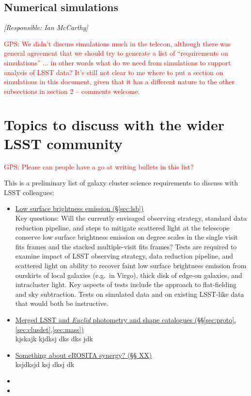 \documentclass[a4paper,11pt]{article}
\newcommand{\red}{\textcolor{red}}
\begin{document}
\subsection{Numerical simulations}\label{sec:sims}

{\it [Responsible: Ian McCarthy]}

\noindent\red{GPS: We didn't discuss simulations much in the telecon,
  although there was general agreement that we should try to generate
  a list of ``requirements on simulations'' ... in other words what do
  we need from simulations to support analysis of LSST data?  It's
  still not clear to me where to put a section on simulations in this
  document, given that it has a different nature to the other
  subsections in section 2 -- comments welcome.}

\section{Topics to discuss with the wider LSST community}

\red{GPS: Please can people have a go at writing bullets in this
  list?}

\noindent This is a preliminary list of galaxy cluster science
requirements to discuss with LSST colleagues:
\begin{itemize}
\item\underline{Low surface brightness emission
  (\S\ref{sec:lsb})}\smallskip\\Key questions: Will the currently
  envisaged observing strategy, standard data reduction pipeline, and
  steps to mitigate scattered light at the telescope conserve low
  surface brightness emission on degree scales in the single visit
  fits frames and the stacked multiple-visit fits frames?  Tests are
  required to examine impact of LSST observing strategy, data
  reduction pipeline, and scattered light on ability to recover faint
  low surface brightness emission from ourskirts of local galaxies
  (e.g.\ in Virgo), thick disk of edge-on galaxies, and intracluster
  light.  Key aspects of tests include the approach to flat-fielding
  and sky subtraction.  Tests on simulated data and on existing
  LSST-like data that would both be instructive.  
\item\underline{Merged LSST and \emph{Euclid} photometry and shape
  catalogues
  (\S\S\ref{sec:proto},\ref{sec:clusdet},\ref{sec:mass})}\smallskip\\kjskajk
  kjdksj dks dks jdk
\item\underline{Something about eROSITA synergy? (\S\S
  XX)}\smallskip\\ksjdksjd ksj dksj dk
\item
\item
\end{itemize}
\end{document}
